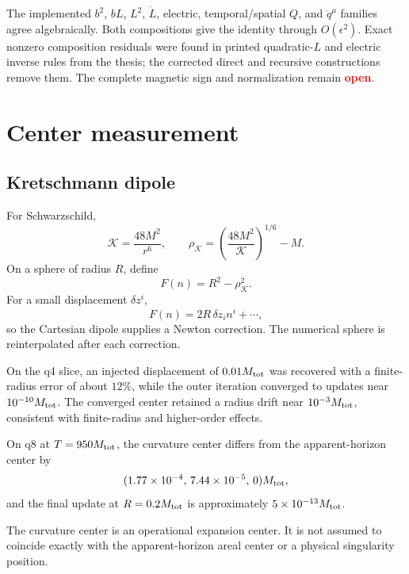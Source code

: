 \documentclass[11pt]{article}
\newcommand{\eps}{\epsilon}
\newcommand{\Kretsch}{\mathcal K}
\newcommand{\status}[2]{\textcolor{#1}{\textbf{#2}}}
\newcommand{\openstatus}{\status{red}{open}}
\begin{document}
The implemented \(b^2\), \(bL\), \(L^2\), \(\dot L\), electric,
temporal/spatial \(Q\), and \(\ddot q^\mu\) families agree algebraically.
Both compositions give the identity through \(O(\eps^2)\).  Exact nonzero
composition residuals were found in printed quadratic-\(L\) and electric
inverse rules from the thesis; the corrected direct and recursive
constructions remove them.  The complete magnetic sign and normalization
remain \openstatus.

\section{Center measurement}

\subsection{Kretschmann dipole}

For Schwarzschild,
\begin{equation}
\Kretsch=\frac{48M^2}{r^6},
\qquad
\rho_{\Kretsch}
=\left(\frac{48M^2}{\Kretsch}\right)^{1/6}-M.
\end{equation}
On a sphere of radius \(R\), define
\begin{equation}
F(n)=R^2-\rho_{\Kretsch}^2.
\end{equation}
For a small displacement \(\delta z^i\),
\begin{equation}
F(n)=2R\,\delta z_i n^i+\cdots,
\end{equation}
so the Cartesian dipole supplies a Newton correction.  The numerical sphere
is reinterpolated after each correction.

On the q4 slice, an injected displacement of \(0.01M_{\rm tot}\) was
recovered with a finite-radius error of about \(12\%\), while the outer
iteration converged to updates near \(10^{-10}M_{\rm tot}\).  The converged
center retained a radius drift near \(10^{-3}M_{\rm tot}\), consistent with
finite-radius and higher-order effects.

On q8 at \(T=950M_{\rm tot}\), the curvature center differs from the
apparent-horizon center by
\begin{equation}
(1.77\times10^{-4},\,7.44\times10^{-5},\,0)M_{\rm tot},
\end{equation}
and the final update at \(R=0.2M_{\rm tot}\) is approximately
\(5\times10^{-13}M_{\rm tot}\).

The curvature center is an operational expansion center.  It is not assumed
to coincide exactly with the apparent-horizon areal center or a physical
singularity position.
\end{document}
